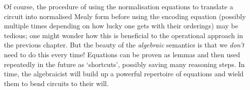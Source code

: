 Of course, the procedure of using the normalisation equations to translate a
circuit into normalised Mealy form before using the encoding equation (possibly
multiple times depending on how lucky one gets with their orderings) may be
tedious; one might wonder how this is beneficial to the operational approach in
the previous chapter.
But the beauty of the \emph{algebraic} semantics is that we \emph{don't} need to
do this every time!
Equations can be proven as lemmas and then used repeatedly in the future as
`shortcuts', possibly saving many reasoning steps.
In time, the algebraicist will build up a powerful repertoire of equations and
wield them to bend circuits to their will.